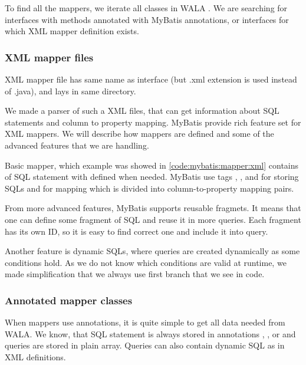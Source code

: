 To find all the mappers, we iterate all classes in WALA .
We are searching for interfaces with methods annotated with MyBatis annotations,
or interfaces for which XML mapper definition exists.



\subsubsection{XML mapper files}

XML mapper file has same name as interface (but .xml extension is used instead of .java),
and lays in same directory.

We made a parser of such a XML files, that can get information about SQL statements
and column to property mapping.
MyBatis provide rich feature set for XML mappers.
We will describe how mappers are defined and some of the advanced features
that we are handling.

Basic mapper, which example was showed in \ref{code:mybatis:mapper:xml} contains of SQL statement
with defined  when needed. MyBatis use tags
, ,  and 
for storing SQLs and  for mapping which is divided into column-to-property
mapping pairs.

From more advanced features, MyBatis supports reusable fragmets. It means that
one can define some fragment of SQL and reuse it in more queries.
Each fragment has its own ID, so it is easy to find correct one and include it into query.

Another feature is dynamic SQLs, where queries are created dynamically
as some conditions hold. As we do not know which conditions are valid
at runtime, we made simplification that we always use first branch
that we see in code.



\subsubsection{Annotated mapper classes}

When mappers use annotations, it is quite simple to get all data needed
from WALA. We know, that SQL statement is always stored in annotations
, ,  or 
and queries are stored in plain  array.
Queries can also contain dynamic SQL as in XML definitions.

